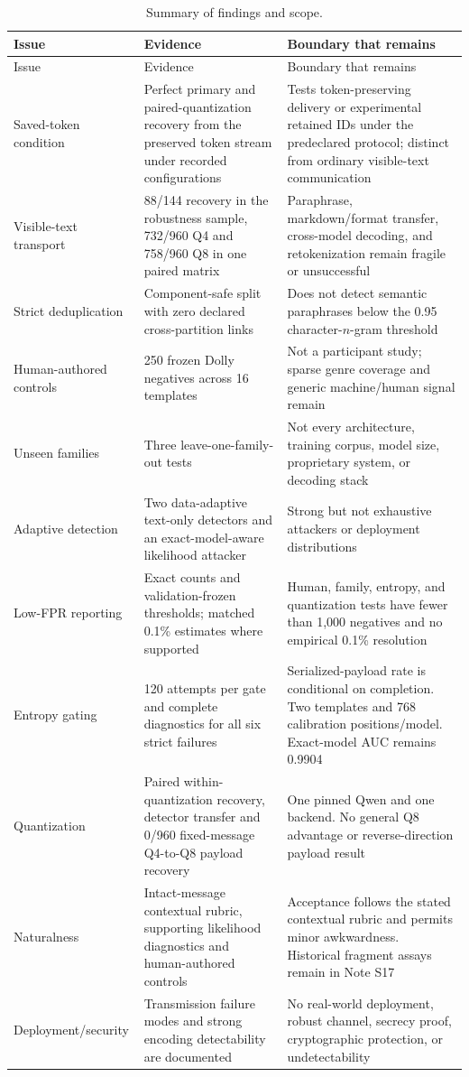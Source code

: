 \documentclass[fleqn,10pt]{wlscirep}
\begin{document}
\begin{longtable}{L{0.23\textwidth}L{0.32\textwidth}L{0.36\textwidth}}
\caption{\label{tab:v3-boundaries}Summary of findings and scope.}\\
\toprule
Issue & Evidence & Boundary that remains \\
\midrule
\endfirsthead
\toprule
Issue & Evidence & Boundary that remains \\
\midrule
\endhead
Saved-token condition & Perfect primary and paired-quantization recovery from the preserved token stream under recorded configurations & Tests token-preserving delivery or experimental retained IDs under the predeclared protocol; distinct from ordinary visible-text communication \\
Visible-text transport & 88/144 recovery in the robustness sample, 732/960 Q4 and 758/960 Q8 in one paired matrix & Paraphrase, markdown/format transfer, cross-model decoding, and retokenization remain fragile or unsuccessful \\
Strict deduplication & Component-safe split with zero declared cross-partition links & Does not detect semantic paraphrases below the 0.95 character-\(n\)-gram threshold \\
Human-authored controls & 250 frozen Dolly negatives across 16 templates & Not a participant study; sparse genre coverage and generic machine/human signal remain \\
Unseen families & Three leave-one-family-out tests & Not every architecture, training corpus, model size, proprietary system, or decoding stack \\
Adaptive detection & Two data-adaptive text-only detectors and an exact-model-aware likelihood attacker & Strong but not exhaustive attackers or deployment distributions \\
Low-FPR reporting & Exact counts and validation-frozen thresholds; matched 0.1\% estimates where supported & Human, family, entropy, and quantization tests have fewer than 1,000 negatives and no empirical 0.1\% resolution \\
Entropy gating & 120 attempts per gate and complete diagnostics for all six strict failures & Serialized-payload rate is conditional on completion. Two templates and 768 calibration positions/model. Exact-model AUC remains 0.9904 \\
Quantization & Paired within-quantization recovery, detector transfer and 0/960 fixed-message Q4-to-Q8 payload recovery & One pinned Qwen and one backend. No general Q8 advantage or reverse-direction payload result \\
Naturalness & Intact-message contextual rubric, supporting likelihood diagnostics and human-authored controls & Acceptance follows the stated contextual rubric and permits minor awkwardness. Historical fragment assays remain in Note S17 \\
Deployment/security & Transmission failure modes and strong encoding detectability are documented & No real-world deployment, robust channel, secrecy proof, cryptographic protection, or undetectability \\
\bottomrule
\end{longtable}
\end{document}
